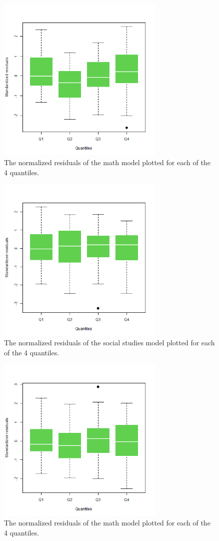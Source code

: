 \documentclass[10pt, a4paper]{article}
\begin{document}
	\begin{figure}
		\includegraphics[width=8cm]{lm_math_residual_boxplot.png}
		\centering
		\caption{The normalized residuals of the math model plotted for each of the 4 quantiles.}
		\label{fig::lm_math_boxplot}
	\end{figure}

	\begin{figure}
		\includegraphics[width=8cm]{lm_socst_residual_boxplot.png}
		\centering
		\caption{The normalized residuals of the social studies model plotted for each of the 4 quantiles. }
		\label{fig::lm_socst_boxplot}
	\end{figure}

	\begin{figure}
		\includegraphics[width=8cm]{lm_math_nopeeking_residual_boxplot.png}
		\centering
		\caption{The normalized residuals of the math model plotted for each of the 4 quantiles. }
		\label{fig::lm_math_nopeeking_boxplot}
	\end{figure}
\end{document}
